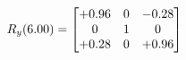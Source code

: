 \documentclass[preview]{standalone}
\begin{document}
\begin{align*}
\special{dvisvgm:raw <g id='unique000'>}R_{y}(6.00) = \begin{bmatrix}+0.96 & 0 & -0.28 \\0 & 1 & 0 \\+0.28 & 0 & +0.96\end{bmatrix}\special{dvisvgm:raw </g>}
\end{align*}
\end{document}
